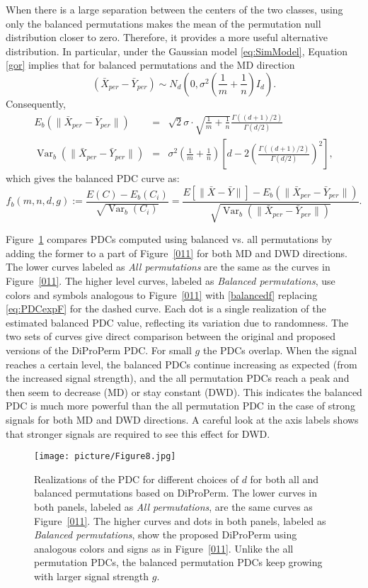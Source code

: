 \documentclass[12pt]{article}
\begin{document}
{When there is a large separation between the centers of the two classes, using only the balanced permutations makes the mean of the permutation null distribution closer to zero. Therefore, it provides a more useful alternative distribution. In particular, under the Gaussian model \eqref{eq:SimModel}, Equation \eqref{gor} implies that for balanced permutations and the MD direction
 \[
 (\bar X_{per}- \bar Y_{per})\sim N_d(0, \sigma^2 (\frac{1}{m}+\frac{1}{n}) I_d).
 \]
Consequently,
\begin{eqnarray*}
E_{b}(\|\bar X_{per}-\bar Y_{per}\|)&=&\sqrt{2}\sigma \cdot\sqrt{\frac{1}{m}+\frac{1}{n}}\frac{\Gamma((d+1)/2)}{\Gamma(d/2)}\\
\operatorname{Var}_{b}(\|\bar X_{per}-\bar Y_{per}\|)&=& \sigma^2 (\frac{1}{m}+\frac{1}{n})[d-2(\frac{\Gamma((d+1)/2)}{\Gamma(d/2)})^2],
\end{eqnarray*}
which gives the balanced PDC curve as:
\begin{equation}
f_{b}(m, n, d, g):= \frac{E(C)-E_{b}(C_i)}{\sqrt{\operatorname{Var}_{b}(C_i)}}=\frac{E[\|\bar X-\bar Y\|]-E_{b}(\|\bar X_{per}-\bar Y_{per}\|)}{\sqrt{\operatorname{Var}_{b}(\|\bar X_{per}-\bar Y_{per}\|)}}.
\label{balancedf}
\end{equation}

Figure~\ref{81} compares PDCs computed using balanced vs. all permutations by adding the former to a part of Figure~\ref{011} for both MD and DWD directions. The lower curves labeled as {\em All permutations} are the same as the curves in Figure~\ref{011}. The higher level curves, labeled as {\em Balanced permutations}, use colors and symbols analogous to Figure~\ref{011} with \eqref{balancedf} replacing \eqref{eq:PDCexpF} for the dashed curve. Each dot is a single realization of the estimated balanced PDC value, reflecting its variation due to randomness.  The two sets of curves give direct comparison between the original and proposed versions of the DiProPerm PDC. For small $g$ the PDCs overlap. When the signal reaches a certain level, the balanced PDCs continue increasing as expected (from the increased signal strength), and the all permutation PDCs reach a peak and then seem to decrease (MD) or stay constant (DWD). This indicates the balanced PDC is much more powerful than the all permutation PDC in the case of strong signals for both MD and DWD directions. A careful look at the axis labels shows that stronger signals are required to see this effect for DWD.

\begin{figure}[H]
  \centering
  \texttt{[image: picture/Figure8.jpg]}\\
    \caption{Realizations of the PDC for different choices of $d$ for both all and balanced permutations based on DiProPerm. The lower curves in both panels, labeled as {\em All permutations}, are the same curves as Figure~\ref{011}. The higher curves and dots in both panels, labeled as {\em Balanced permutations}, show the proposed DiProPerm using analogous colors and signs as in Figure~\ref{011}. Unlike the all permutation PDCs, the balanced permutation PDCs keep growing with larger signal strength $g$.}
    \label{81}
\end{figure}
}
\end{document}
